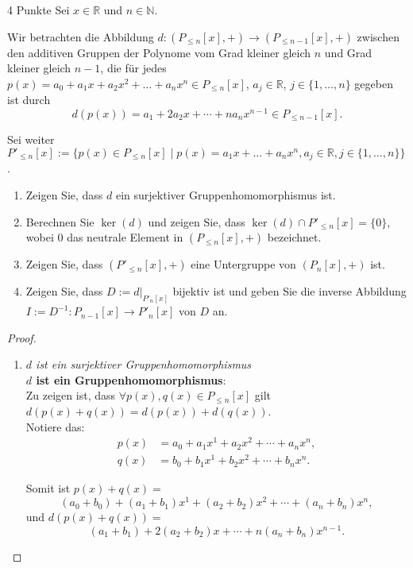 \documentclass{problemset}
\begin{document}
\begin{problem}{4 Punkte}
Sei $x \in \mathbb{R}$ und $n \in \mathbb{N}$.

Wir betrachten die Abbildung $d: (P_{\le n }[x], +) \to (P_{\le n-1}[x], +)$
zwischen den additiven Gruppen der Polynome vom Grad kleiner gleich $n$ und
Grad kleiner gleich $n - 1$, die für jedes $p(x) = a_0 + a_1x + a_2x^2 + \ldots
+ a_nx^n \in P_{\le n}[x]$, $a_j \in \mathbb{R}$, $j \in \{1, \ldots, n\}$
gegeben ist durch \[
    d(p(x)) = a_1 + 2a_2x + \cdots + na_nx^{n-1} \in P_{\le n-1}[x].
\]

Sei weiter $P'_{\le n}[x] := \{p(x) \in P_{\le n}[x] \mid p(x) = a_1x + \ldots
+ a_nx^n, a_j \in \mathbb{R}, j \in \{1, \ldots, n\}\}$.

\begin{enumerate}
    \item Zeigen Sie, dass $d$ ein surjektiver Gruppenhomomorphismus ist.
    \item Berechnen Sie $\ker(d)$ und zeigen Sie, dass $\ker(d) \cap P'_{\le
          n}[x] = \{0\}$, wobei $0$ das neutrale Element in $(P_{\le n}[x], +)$
          bezeichnet.
    \item Zeigen Sie, dass $(P'_{\le n}[x], +)$ eine Untergruppe von $(P_n[x],
          +)$ ist.
    \item Zeigen Sie, dass $D := d|_{P'_n[x]}$ bijektiv ist und geben Sie die
          inverse Abbildung $I := D^{-1}: P_{n-1}[x] \to P'_n[x]$ von $D$ an.
\end{enumerate}

\begin{proof}
    \begin{enumerate}
        \item \textit{$d$ ist ein surjektiver Gruppenhomomorphismus} \\
              \textbf{$d$ ist ein Gruppenhomomorphismus}: \\
              Zu zeigen ist, dass $\forall p(x),q(x) \in P_{\le n}[x]$ gilt $d(p(x) + q(x)) = d(p(x)) + d(q(x))$. \\

              Notiere das:
              \begin{align}
                  p(x) & = a_0 + a_1x^1 + a_2x^2 + \cdots + a_nx^n, \\
                  q(x) & = b_0 + b_1x^1 + b_2x^2 + \cdots + b_nx^n.
              \end{align}

              Somit ist $p(x) + q(x) =$ \[
                  (a_0+b_0) + (a_1+b_1)x^1 + (a_2 + b_2)x^2 + \cdots + (a_n+b_n)x^n,
              \] und $d(p(x) + q(x)) =$ \[
                  (a_1+b_1) + 2(a_2 + b_2)x + \cdots + n(a_n+b_n)x^{n-1}.
              \]


\end{enumerate}
\end{proof}
\end{problem}
\end{document}
